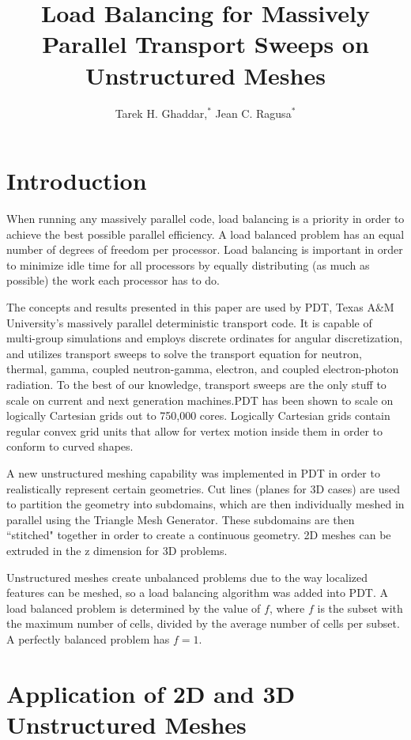 \documentclass{anstrans}
\title{Load Balancing for Massively Parallel Transport Sweeps on Unstructured Meshes }
\author{Tarek H. Ghaddar,$^{*}$ Jean C. Ragusa$^{*}$}
\institute{
$^{*}$Dept. of Nuclear Engineering, Texas A\&M University, College Station, TX, 77843-3133
\and

}
\begin{document}
\section{Introduction}
\label{ch:introduction}
When running any massively parallel code, load balancing is a priority in order to achieve the best possible parallel efficiency. A load balanced problem has an equal number of degrees of freedom per processor. Load balancing is important in order to minimize idle time for all processors by equally distributing (as much as possible) the work each processor has to do.

The concepts and results presented in this paper are used by PDT, Texas A\&M University's massively parallel deterministic transport code. It is capable of multi-group simulations and employs discrete ordinates for angular discretization, and utilizes transport sweeps to solve the transport equation for neutron, thermal, gamma, coupled neutron-gamma, electron, and coupled electron-photon radiation. To the best of our knowledge, transport sweeps are the only stuff to scale on current and next generation machines.PDT  has been shown to scale on logically Cartesian grids out to 750,000 cores\cite{mpadams2015}. Logically Cartesian grids contain regular convex grid units that allow for vertex motion inside them in order to conform to curved shapes. 

A new unstructured meshing capability was implemented in PDT in order to realistically represent certain geometries. Cut lines (planes for 3D cases) are used to partition the geometry into subdomains, which are then individually meshed in parallel using the Triangle Mesh Generator\cite{triangle}. These subdomains are then ``stitched" together in order to create a continuous geometry. 2D meshes can be extruded in the z dimension for 3D problems. 

Unstructured meshes create unbalanced problems due to the way localized features can be meshed, so a load balancing algorithm was added into PDT. A load balanced problem is determined by the value of $f$, where $f$ is the subset with the maximum number of cells, divided by the average number of cells per subset. A perfectly balanced problem has $f = 1$.




\section{Application of 2D and 3D Unstructured Meshes}
\label{ch:motivation}
\end{document}
